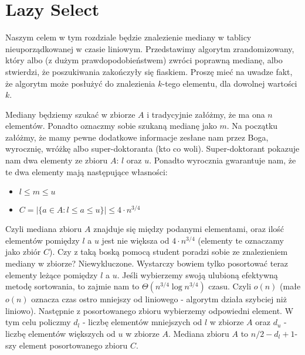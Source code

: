 \section{Lazy Select}
 
Naszym celem w tym rozdziale będzie znalezienie mediany w tablicy nieuporządkowanej w czasie liniowym.
Przedstawimy algorytm zrandomizowany, który albo (z dużym prawdopodobieństwem) zwróci poprawną medianę, albo stwierdzi, że poszukiwania zakończyły się fiaskiem.
Proszę mieć na uwadze fakt, że algorytm może posłużyć do znalezienia $k$-tego elementu, dla dowolnej wartości $k$.

Mediany będziemy szukać w zbiorze $A$ i tradycyjnie załóżmy, że ma ona $n$ elementów.
Ponadto oznaczmy sobie szukaną medianę jako $m$.
Na początku załóżmy, że mamy pewne dodatkowe informacje zesłane nam przez Boga, wyrocznię, wróżkę albo super-doktoranta (kto co woli).
Super-doktorant pokazuje nam dwa elementy ze zbioru $A$: $l$ oraz $u$.
Ponadto wyrocznia gwarantuje nam, że te dwa elementy mają następujące własności:
\begin{itemize}
 \item $l \leq m \leq u$
 \item $C = |\{a \in A: l \leq a \leq u\}| \leq 4 \cdot n^{3/4}$
\end{itemize}
Czyli mediana zbioru $A$ znajduje się między podanymi elementami, oraz ilość elementów pomiędzy $l$ a $u$ jest nie większa od $4 \cdot n^{3/4}$ (elementy te oznaczamy jako zbiór $C$).
Czy z taką boską pomocą student poradzi sobie ze znalezieniem mediany w zbiorze?
Niewykluczone.
Wystarczy bowiem tylko posortować teraz elementy leżące pomiędzy $l$ a $u$.
Jeśli wybierzemy swoją ulubioną efektywną metodę sortowania, to zajmie nam to $\Theta(n^{3/4} \log n^{3/4})$ czasu.
Czyli $o(n)$ (małe $o(n)$ oznacza czas ostro mniejszy od liniowego - algorytm działa szybciej niż liniowo).
Następnie z posortowanego zbioru wybierzemy odpowiedni element.
W tym celu policzmy $d_l$ - liczbę elementów mniejszych od $l$ w zbiorze $A$ oraz $d_u$ - liczbę elementów większych od $u$ w zbiorze $A$.
Mediana zbioru $A$ to $n/2 - d_l + 1$-szy element posortowanego zbioru $C$.

